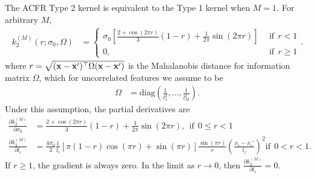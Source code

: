 The ACFR Type 2 kernel is equivalent to the Type 1 kernel when $M = 1$.  For arbitrary
$M$,
\begin{align*}
  k_2^{(M)} (r; \sigma_0, \Omega) &= \left\{
    \begin{array}{cc}
      \sigma_0 \left[\frac{2+\cos(2\pi r)}{3} \left(1 -
          r\right) + \frac{1}{2\pi} \sin \left(2\pi r\right)\right] \ \
      & \text{if}\ \ r < 1 \\
      0, & \text{if}\ \ r \ge 1
    \end{array}
  \right..
\end{align*}
where $r = \sqrt{({\bf x} - {\bf x}')^\top \Omega ({\bf x} - {\bf x}')}$ is the
Mahalanobis distance for information matrix $\Omega$, which for uncorrelated features we
assume to be
\begin{align*}
  \Omega &= \text{diag}\left(\frac{1}{l_1^2}, \dots, \frac{1}{l_M^2}\right).
\end{align*}
Under this assumption, the partial derivatives are
\begin{align*}
  \frac{\partial k_2^{(M)}}{\partial
    \sigma_0} &= \frac{2+\cos(2\pi r)}{3} (1 - r) + \frac{1}{2\pi} \sin (2\pi r), \ 
  \ \text{if}\ \ 0 \le r < 1 \\
  \frac{\partial k_2^{(M)}}{\partial
    l_i} &= \frac{4\sigma_0}{3} \frac{1}{l_i} \left[\pi \left(1 - r\right)
        \cos \left(\pi r\right) + \sin \left(\pi r\right)\right]
      \frac{\sin \left(\pi r\right)}{r} \left(\frac{x_i - x_i'}{l_j}\right)^2 \text{if}\ \
      0 < r < 1.
\end{align*}
If $r\ge 1$, the gradient is always zero.  In the limit as $r \rightarrow 0$, then $
\frac{\partial k_2^{(M)}}{\partial l_i} = 0$.

